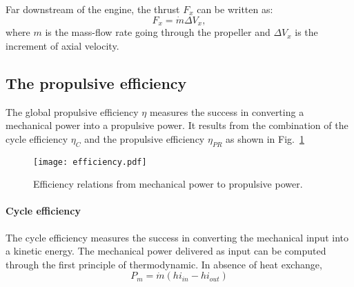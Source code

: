 Far downstream of the engine, 
the thrust $F_x$ can be written as:
\begin{equation}
	F_x = \dot{m} \Delta V_x,
\end{equation}
where $m$ is the mass-flow rate going through the
propeller and $\Delta V_x$ is
the increment of axial velocity.

\subsection{The propulsive efficiency}
\label{sub:cror_efficiency}

The global propulsive efficiency $\eta$ measures the 
success in converting a mechanical power into a
propulsive power. It results from the combination
of the cycle efficiency $\eta_{C}$ and the propulsive efficiency
$\eta_{PR}$ as shown in Fig.~\ref{fig:cror_efficiency}
\begin{figure}[htb]
  \centering
  \texttt{[image: efficiency.pdf]}
  \caption{Efficiency relations from mechanical power to propulsive power.}
  \label{fig:cror_efficiency}
\end{figure}

\paragraph{Cycle efficiency}
The cycle efficiency measures the success in converting the mechanical
input into a kinetic energy. The mechanical power delivered as input
can be computed through the first principle of thermodynamic. In absence
of heat exchange, 
\begin{equation}
	P_m = \dot{m} \left(hi_{in} - hi_{out} \right)
\end{equation}
